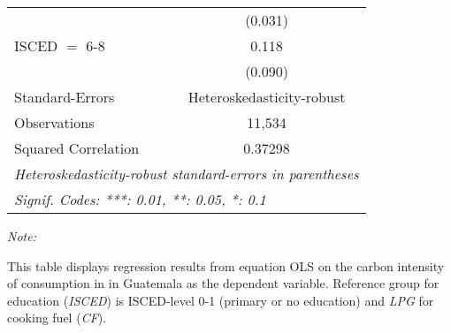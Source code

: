\begin{table}[htbp!]
\begin{adjustbox}{width = 1\textwidth, max height = 0.95\textheight, center}
\begin{threeparttable}[b]
\begin{tabular}{lc}
                                & (0.031)\\   
            ISCED $=$ 6-8       & 0.118\\   
                                & (0.090)\\   
            \midrule 
            Standard-Errors     & Heteroskedasticity-robust \\   
            Observations        & 11,534\\  
            Squared Correlation & 0.37298\\  
            \midrule \midrule
            \multicolumn{2}{l}{\emph{Heteroskedasticity-robust standard-errors in parentheses}}\\
            \multicolumn{2}{l}{\emph{Signif. Codes: ***: 0.01, **: 0.05, *: 0.1}}\\
         \end{tabular}
         
         \begin{tablenotes}\item \medskip \textit{Note:}
            \item This table displays regression results from equation OLS on the carbon intensity of consumption in  in Guatemala as the dependent variable. Reference group for education (\textit{ISCED}) is ISCED-level 0-1 (primary or no education) and \textit{LPG} for cooking fuel (\textit{CF}).
         \end{tablenotes}
      \end{threeparttable}
   \end{adjustbox}
\end{table}


